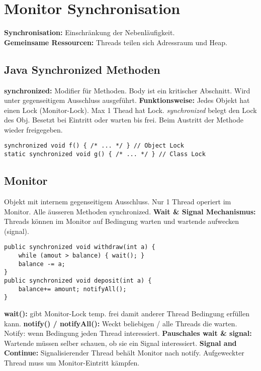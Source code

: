 
\section{Monitor Synchronisation}
\textbf{Synchronisation:} Einschränkung der Nebenläufigkeit.\\
\textbf{Gemeinsame Ressourcen:} Threads teilen sich Adressraum und Heap.

\subsection{Java Synchronized Methoden}
\textbf{synchronized:} Modifier für Methoden. Body ist ein kritischer Abschnitt. 
Wird unter gegenseitigem Ausschluss ausgeführt.
\textbf{Funktionsweise:} Jedes Objekt hat einen Lock (Monitor-Lock).
Max 1 Thead hat Lock. \textit{synchronized} belegt den Lock des Obj. Besetzt bei Eintritt oder warten bis frei.
Beim Austritt der Methode wieder freigegeben.

\begin{lstlisting}
synchronized void f() { /* ... */ } // Object Lock
static synchronized void g() { /* ... */ } // Class Lock
\end{lstlisting}

\subsection{Monitor}
Objekt mit internem gegenseitigem Ausschluss. Nur 1 Thread operiert im Monitor. Alle äusseren Methoden synchronized.
\textbf{Wait \& Signal Mechanismus:} Threads können im Monitor auf Bedingung warten und wartende aufwecken (signal).

\begin{lstlisting}
public synchronized void withdraw(int a) {
    while (amout > balance) { wait(); }
    balance -= a;
}
public synchronized void deposit(int a) {
    balance+= amount; notifyAll();
}
\end{lstlisting}
\textbf{wait():} gibt Monitor-Lock temp. frei damit anderer Thread Bedingung erfüllen kann.
\textbf{notify() / notifyAll():} Weckt beliebigen / alle Threads die warten. Notify: wenn Bedingung jeden Thread interessiert. 
\textbf{Pauschales wait \& signal:} Wartende müssen selber schauen, ob sie ein Signal interessiert.
\textbf{Signal and Continue:} Signalisierender Thread behält Monitor nach notify. Aufgeweckter Thread muss um Monitor-Eintritt kämpfen.
